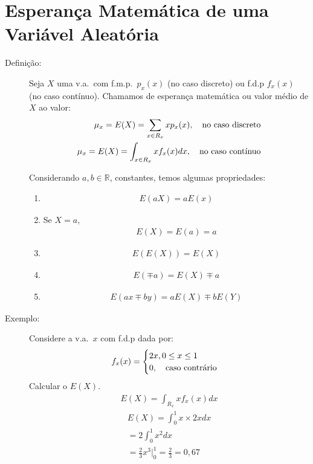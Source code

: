 \documentclass[11pt,a4paper]{book}
\begin{document}
 \section{Esperança Matemática de uma Variável Aleatória}
 \begin{description}
   \item [Definição:] Seja $X$ uma v.a.\ com f.m.p.\ $p_{x}(x)$ (no caso discreto) ou f.d.p
     $f_{x}(x)$ (no caso contínuo). Chamamos de esperança matemática ou valor médio 
     de $X$ ao valor: 
     \begin{align}
       \mu_{x}= E(X)= \sum_{x \in R_{x}} x p_{x}(x) , 
       \text{\quad no caso discreto}\\
       \mu_{x}= E(X)= \int_{x \in R_{x}} x f_{x}(x)dx, \text{\quad no caso contínuo}
     \end{align}

     Considerando $a,b \in \mathbb{R}$, constantes, temos  algumas propriedades:

     \begin{enumerate}[label=(\alph*)]
       \item 
         \begin{align}
           E(aX)=aE(x)
         \end{align}
       \item Se $X=a$, 
         \begin{align}
           E(X)=E(a)=a
         \end{align}
       \item 
       \begin{align}    E(E(X))= E(X)\end{align}
       \item 
       \begin{align}  E(\mp a)=E(X)\mp a\end{align}
       \item 
       \begin{align}  E(ax\mp by)=aE(X)\mp b E(Y)\end{align}
     \end{enumerate}
   \item [Exemplo:]Considere a v.a.\ $x$ com f.d.p dada por: 
     \begin{align*}
       f_{x}(x)=\begin{cases}
         2x, 0\le x \le 1 \\
         0, \text{\quad caso contrário}
       \end{cases}
     \end{align*}
     Calcular o $E(X)$.
     \begin{align*}
       E(X)=\int_{R_{x}} x f_{x}(x)dx
     \end{align*}
     \begin{align*}
       E(X)=\int_{0}^{1} x\times 2xdx\\
       = 2 \int_{0}^{1} x^{2}dx \\
       = \frac{2}{3} x^{3} |^1_0 = \frac{2}{3}=0,67
     \end{align*}


\end{description}
\end{document}

